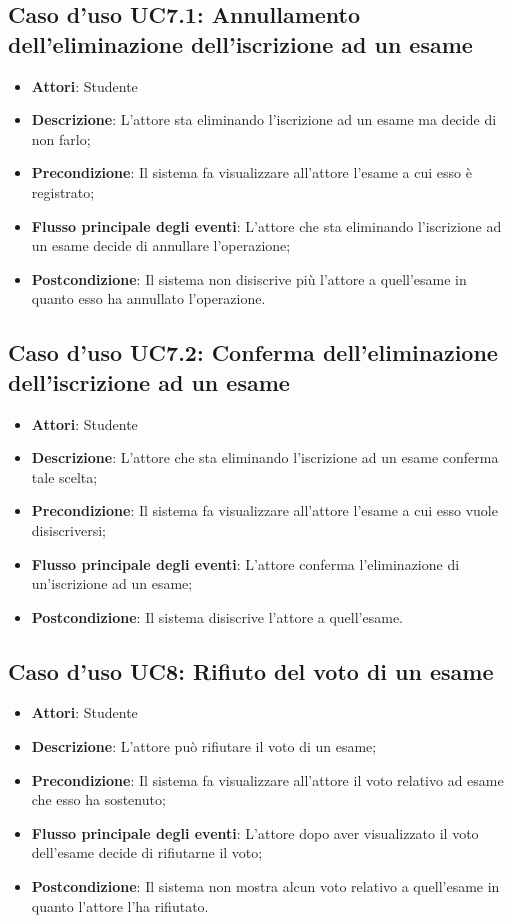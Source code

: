 \subsection{Caso d'uso \texorpdfstring{UC7.1}{UC7.1}: Annullamento dell'eliminazione dell'iscrizione ad un esame}
\begin{itemize}
\item \textbf{Attori}: Studente
\item \textbf{Descrizione}: L'attore sta eliminando l'iscrizione ad un esame ma decide di non farlo;
\item \textbf{Precondizione}: Il sistema fa visualizzare all'attore l'esame a cui esso è registrato;

\item \textbf{Flusso principale degli eventi}: L'attore che sta eliminando l'iscrizione ad un esame decide di annullare l'operazione;
\item \textbf{Postcondizione}: Il sistema non disiscrive più l'attore a quell'esame in quanto esso ha annullato l'operazione.

\end{itemize}
\subsection{Caso d'uso \texorpdfstring{UC7.2}{UC7.2}: Conferma dell'eliminazione dell'iscrizione ad un esame}
\begin{itemize}
\item \textbf{Attori}: Studente
\item \textbf{Descrizione}: L'attore che sta eliminando l'iscrizione ad un esame conferma tale scelta;
\item \textbf{Precondizione}: Il sistema fa visualizzare all'attore l'esame a cui esso vuole disiscriversi;

\item \textbf{Flusso principale degli eventi}: L'attore conferma l'eliminazione di un'iscrizione ad un esame;
\item \textbf{Postcondizione}: Il sistema disiscrive l'attore a quell'esame.

\end{itemize}
\subsection{Caso d'uso \texorpdfstring{UC8}{UC8}: Rifiuto del voto di un esame}
\begin{itemize}
\item \textbf{Attori}: Studente
\item \textbf{Descrizione}: L'attore può rifiutare il voto di un esame;
\item \textbf{Precondizione}: Il sistema fa visualizzare all'attore il voto relativo ad esame che esso ha sostenuto;
\item \textbf{Flusso principale degli eventi}: L'attore dopo aver visualizzato il voto dell'esame decide di rifiutarne il voto;
\item \textbf{Postcondizione}: Il sistema non mostra alcun voto relativo a quell'esame in quanto l'attore l'ha rifiutato.
\end{itemize}
